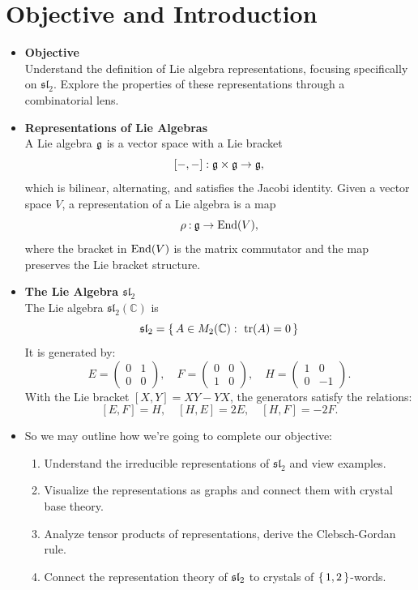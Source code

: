 \documentclass[12pt]{memoir}
\begin{document}
\section{Objective and Introduction}

\begin{itemize}
    \item \textbf{Objective}\\ 
    Understand the definition of Lie algebra representations, focusing specifically on $\mathfrak{sl}_2$. Explore the properties of these representations through a combinatorial lens.
    
    \item \textbf{Representations of Lie Algebras}\\
    A Lie algebra \(\mathfrak{g}\) is a vector space with a Lie bracket 
    \[
    \left\lbrack-,-\right\rbrack:\mathfrak{g}\times\mathfrak{g}\to\mathfrak{g},
    \]
    which is bilinear, alternating, and satisfies the Jacobi identity. Given a vector space \(V\), a representation of a Lie algebra is a map
    \[
    \rho\mathbin{:}\mathfrak{g}\to\operatorname{End}(V),
    \]
    where the bracket in \(\operatorname{End}(V)\) is the matrix commutator and the map preserves the Lie bracket structure.
    \item \textbf{The Lie Algebra $\mathfrak{sl}_2$}\\
    The Lie algebra $\mathfrak{sl}_2(\mathbb{C})$ is
    \[
    \gsl_2=\set{A\in M_2(\bC):\ \tr(A)=0}
    \]
    It is generated by:
    \[
    E = \begin{pmatrix} 0 & 1 \\ 0 & 0 \end{pmatrix}, \quad F = \begin{pmatrix} 0 & 0 \\ 1 & 0 \end{pmatrix}, \quad H = \begin{pmatrix} 1 & 0 \\ 0 & -1 \end{pmatrix}.
    \]
    With the Lie bracket \([X,Y]=XY-YX\), the generators satisfy the relations:
    \[
    [E, F] = H, \quad [H, E] = 2E, \quad [H, F] = -2F.
    \]

    \item So we may outline how we're going to complete our objective:
    \begin{enumerate}
        \item Understand the irreducible representations of $\mathfrak{sl}_2$ and view examples. 
        \item Visualize the representations as graphs and connect them with crystal base theory.
        \item Analyze tensor products of representations, derive the Clebsch-Gordan rule.
        \item Connect the representation theory of \(\mathfrak{sl}_2\) to crystals of \(\{\,1,2\,\}\)-words.
    \end{enumerate}
\end{itemize}
\vfill
\newpage
\end{document}
